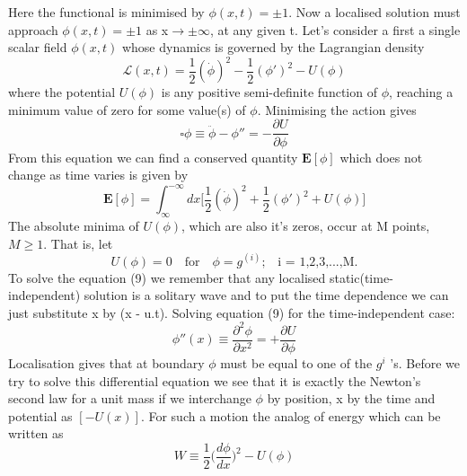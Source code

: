 \documentclass[a4paper, 12pt]{article}
\begin{document}
 Here the functional is minimised by $\phi(x,t)=\pm 1$. Now a localised solution must approach $\phi(x,t)=\pm 1$ as x$\to \pm \infty$, at any given t.
  \linebreak
Let's consider a first a single scalar field $\phi(x,t)$ whose dynamics is governed by the Lagrangian density
\begin{equation}%
\mathcal{L}(x,t) = \frac{1}{2}(\dot{\phi})^2 - \frac{1}{2}(\phi')^2  -U(\phi)
\end{equation}
 where the potential $U(\phi)$ is any positive semi-definite function of $\phi$, reaching a minimum value of zero for some value(s) of $\phi$. Minimising the action gives
 \begin{equation}%
 \square \phi \equiv \ddot{\phi} - \phi'' = -\frac{\partial U}{\partial \phi}
 \end{equation}
 From this equation we can find a conserved quantity $\bm E[\phi]$ which does not change as time varies is given by
 \begin{equation}%
 \bm  E[\phi] = \int_{\infty}^{-\infty} dx \bigg[\frac{1}{2}(\dot{\phi})^2 + \frac{1}{2}(\phi')^2  + U(\phi)\bigg]
 \end{equation}
 The absolute minima of $U(\phi)$, which are also it's zeros, occur at M points, $M\geq 1$. That is, let
 \begin{equation}%
 U(\phi) = 0 \quad \textrm{for} \quad \textrm{$\phi =g^{(i)}$;} \quad \textrm{i = 1,2,3,...,M.}
 \end{equation}
To solve the equation (9) we remember that any localised static(time-independent) solution is a solitary wave and to put the time dependence we can just substitute x by (x - u.t). Solving equation (9) for the time-independent case:
\begin{equation}%
\phi''(x) \equiv \frac{\partial^2 \phi}{\partial x^2} = +\frac{\partial U}{\partial \phi}
\end{equation}
Localisation gives that at boundary $\phi$ must be equal to one of the $g^i$ 's. Before we try to solve this differential equation we see that it is exactly the Newton's second law for a unit mass if we interchange $\phi$ by position, x by the time and potential as $[-U(x)]$. For such a motion the analog of energy which can be written as
\begin{equation}%
W \equiv \frac{1}{2}\bigg(\frac{d\phi}{dx}\bigg)^2 - U(\phi)
\end{equation}
\end{document}
